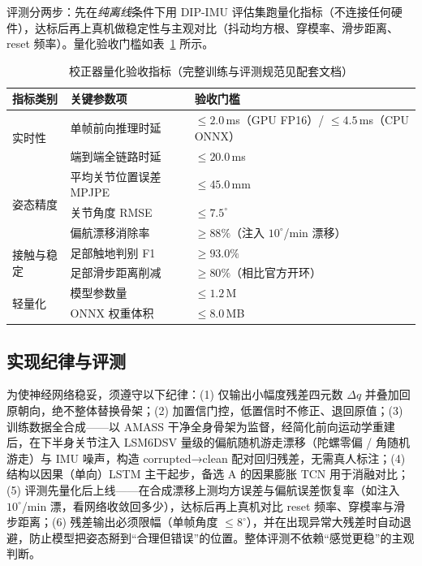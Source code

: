 \documentclass[scheme=plain,UTF8,11pt,a4paper]{ctexart}
\begin{document}
评测分两步：先在\emph{纯离线}条件下用 DIP-IMU 评估集跑量化指标（不连接任何硬件），达标后再上真机做稳定性与主观对比（抖动均方根、穿模率、滑步距离、reset 频率）。量化验收门槛如表~\ref{tab:kpi} 所示。

\begin{table}[H]
\centering
\small
\caption{校正器量化验收指标（完整训练与评测规范见配套文档）}
\label{tab:kpi}
\begin{tabular}{p{2.6cm}p{5.2cm}p{5.2cm}}
\toprule
\textbf{指标类别} & \textbf{关键参数项} & \textbf{验收门槛} \\
\midrule
\multirow{2}{*}{实时性}
    & 单帧前向推理时延 & $\le 2.0$\,ms（GPU FP16）/ $\le 4.5$\,ms（CPU ONNX） \\
    & 端到端全链路时延 & $\le 20.0$\,ms \\
\midrule
\multirow{3}{*}{姿态精度}
    & 平均关节位置误差 MPJPE & $\le 45.0$\,mm \\
    & 关节角度 RMSE & $\le 7.5^{\circ}$ \\
    & 偏航漂移消除率 & $\ge 88\%$（注入 $10^{\circ}$/min 漂移） \\
\midrule
\multirow{2}{*}{接触与稳定}
    & 足部触地判别 F1 & $\ge 93.0\%$ \\
    & 足部滑步距离削减 & $\ge 80\%$（相比官方开环） \\
\midrule
\multirow{2}{*}{轻量化}
    & 模型参数量 & $\le 1.2$\,M \\
    & ONNX 权重体积 & $\le 8.0$\,MB \\
\bottomrule
\end{tabular}
\end{table}

\subsection{实现纪律与评测}
\label{subsec:discipline}

为使神经网络稳妥，须遵守以下纪律：(1) 仅输出小幅度残差四元数 $\Delta q$ 并叠加回原朝向，绝不整体替换骨架；(2) 加置信门控，低置信时不修正、退回原值；(3) 训练数据全合成——以 AMASS 干净全身骨架为监督，经简化前向运动学重建后，在下半身关节注入 LSM6DSV 量级的偏航随机游走漂移（陀螺零偏 / 角随机游走）与 IMU 噪声，构造 corrupted→clean 配对回归残差，无需真人标注；(4) 结构以因果（单向）LSTM 主干起步，备选 A 的因果膨胀 TCN 用于消融对比；(5) 评测先量化后上线——在合成漂移上测均方误差与偏航误差恢复率（如注入 $10^{\circ}$/min 漂，看网络收敛回多少），达标后再上真机对比 reset 频率、穿模率与滑步距离；(6) 残差输出必须限幅（单帧角度 $\le 8^{\circ}$），并在出现异常大残差时自动退避，防止模型把姿态掰到“合理但错误”的位置。整体评测不依赖“感觉更稳”的主观判断。
\end{document}
